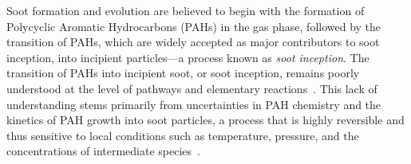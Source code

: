 Soot formation and evolution are believed to begin with the formation of Polycyclic Aromatic Hydrocarbons (PAHs) in the gas phase, followed by the transition of PAHs, which are widely accepted as major contributors to soot inception, into incipient particles—a process known as \textit{soot inception}.
The transition of PAHs into incipient soot, or soot inception, remains poorly understood at the level of pathways and elementary reactions~\citep{Wang2011}. This lack of understanding stems primarily from uncertainties in PAH chemistry and the kinetics of PAH growth into soot particles, a process that is highly reversible and thus sensitive to local conditions such as temperature, pressure, and the concentrations of intermediate species~\citep{Wang2011}.


